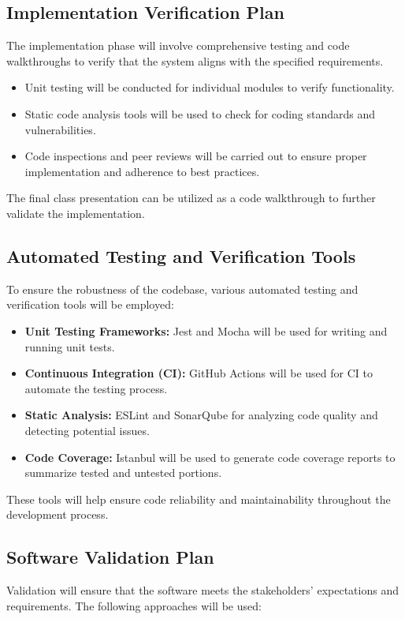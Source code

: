 \documentclass[12pt, titlepage]{article}
\begin{document}
\subsection{Implementation Verification Plan}
The implementation phase will involve comprehensive testing and code walkthroughs to verify that the system aligns with the specified requirements.

\begin{itemize}
    \item Unit testing will be conducted for individual modules to verify functionality.
    \item Static code analysis tools will be used to check for coding standards and vulnerabilities.
    \item Code inspections and peer reviews will be carried out to ensure proper implementation and adherence to best practices.
\end{itemize}

The final class presentation can be utilized as a code walkthrough to further validate the implementation.

\subsection{Automated Testing and Verification Tools}
To ensure the robustness of the codebase, various automated testing and verification tools will be employed:

\begin{itemize}
    \item \textbf{Unit Testing Frameworks:} Jest and Mocha will be used for writing and running unit tests.
    \item \textbf{Continuous Integration (CI):} GitHub Actions will be used for CI to automate the testing process.
    \item \textbf{Static Analysis:} ESLint and SonarQube for analyzing code quality and detecting potential issues.
    \item \textbf{Code Coverage:} Istanbul will be used to generate code coverage reports to summarize tested and untested portions.
\end{itemize}

These tools will help ensure code reliability and maintainability throughout the development process.

\subsection{Software Validation Plan}
Validation will ensure that the software meets the stakeholders' expectations and requirements. The following approaches will be used:
\end{document}
